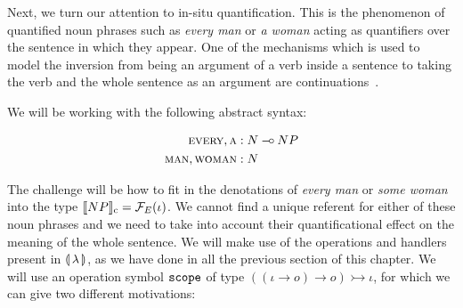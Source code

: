 Next, we turn our attention to in-situ quantification. This is the
phenomenon of quantified noun phrases such as \emph{every man} or \emph{a
  woman} acting as quantifiers over the sentence in which they appear. One
of the mechanisms which is used to model the inversion from being an
argument of a verb inside a sentence to taking the verb and the whole
sentence as an argument are
continuations~\cite{de2001type,barker2002continuations}.

We will be working with the following abstract syntax:

\begin{align*}
  \textsc{every}, \textsc{a} &: N \mathbin{{-}\mkern-3.5mu{\circ}} NP \\
  \textsc{man}, \textsc{woman} &: N
\end{align*}

The challenge will be how to fit in the denotations of \emph{every man} or
\emph{some woman} into the type $\llbracket NP \rrbracket_{\mathrm{c}} = \mathcal{F}_E(\iota)$. We
cannot find a unique referent for either of these noun phrases and we need
to take into account their quantificational effect on the meaning of the
whole sentence. We will make use of the operations and handlers present in
$\llparenthesis \, \lambda \, \rrparenthesis$, as we have done in all the previous section of this
chapter. We will use an operation symbol $\mathtt{scope}$ of type
$((\iota \to o) \to o) \rightarrowtail \iota$, for which we can give two
different motivations:

